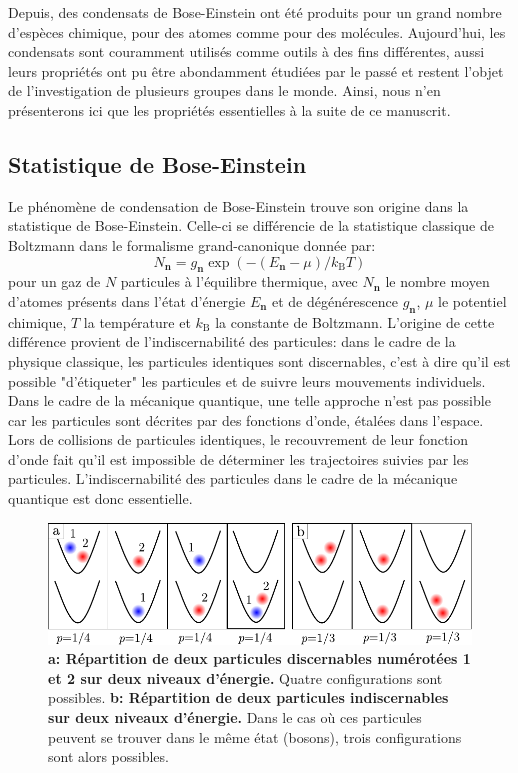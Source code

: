 Depuis, des condensats de Bose-Einstein ont été produits pour un grand nombre d'espèces chimique, pour des atomes comme pour des molécules. Aujourd'hui, les condensats sont couramment utilisés comme outils à des fins différentes, aussi leurs propriétés ont pu être abondamment étudiées par le passé et restent l'objet de l'investigation de plusieurs groupes dans le monde. Ainsi, nous n'en présenterons ici que les propriétés essentielles à la suite de ce manuscrit.

\subsection{Statistique de Bose-Einstein}
Le phénomène de condensation de Bose-Einstein trouve son origine dans la statistique de Bose-Einstein. Celle-ci se différencie de la statistique classique de Boltzmann dans le formalisme grand-canonique donnée par:
\begin{equation}
N_{\mathbf{n}}=g_{\mathbf{n}} \exp{\left( -(E_{\mathbf{n}}-\mu)/k_{\mathrm{B}}T \right)}
\end{equation}
pour un gaz de $N$ particules à l'équilibre thermique, avec $N_{\mathbf{n}}$ le nombre moyen d'atomes présents dans l'état d'énergie $E_{\mathbf{n}}$ et de dégénérescence $g_{\mathbf{n}}$, $\mu$ le potentiel chimique, $T$ la température et $k_{\mathrm{B}}$ la constante de Boltzmann. L'origine de cette différence provient de l'indiscernabilité des particules: dans le cadre de la physique classique, les particules identiques sont discernables, c'est à dire qu'il est possible "d'étiqueter" les particules et de suivre leurs mouvements individuels.
Dans le cadre de la mécanique quantique, une telle approche n'est pas possible car les particules sont décrites par des fonctions d'onde, étalées dans l'espace. Lors de collisions de particules identiques, le recouvrement de leur fonction d'onde fait qu'il est impossible de déterminer les trajectoires suivies par les particules. L'indiscernabilité des particules dans le cadre de la mécanique quantique est donc essentielle.

\begin{figure}
\centering
\includegraphics[width=\textwidth]{Fig/BEC_manip/stat_bose.pdf}
\caption{\textbf{a: Répartition de deux particules discernables numérotées 1 et 2 sur deux niveaux d'énergie.} Quatre configurations sont possibles. \textbf{b: Répartition de deux particules indiscernables sur deux niveaux d'énergie.} Dans le cas où ces particules peuvent se trouver dans le même état (bosons), trois configurations sont alors possibles.}
\label{fig:stat_bose}
\end{figure}

